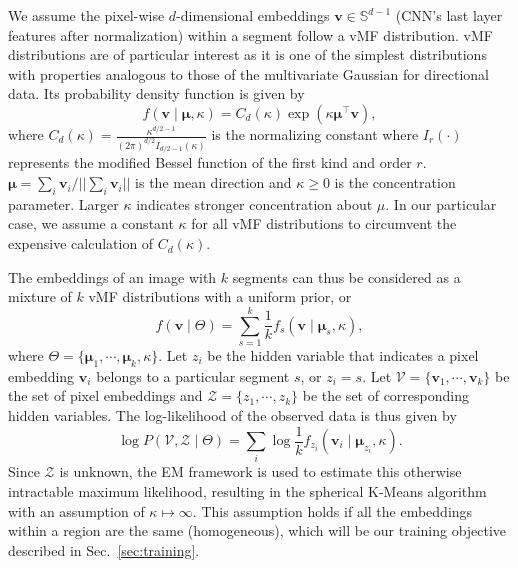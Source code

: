 \documentclass[10pt,twocolumn,letterpaper]{article}
\begin{document}
We assume the pixel-wise $d$-dimensional embeddings $\pmb{v}\in \mathbb{S}^{d-1}$ (CNN's last layer features after normalization) within a segment follow a vMF distribution.
vMF distributions are of particular interest as it is one of the simplest distributions with properties analogous to those of the multivariate Gaussian for directional data.
Its probability density function is given by
\begin{equation}
\label{eqn:vmf}
f(\pmb{v} \mid \pmb{\mu}, \kappa) = C_d(\kappa)
\exp(\kappa \pmb{\mu}^\top \pmb{v}),
\end{equation}
where $C_d(\kappa) = \frac{ \kappa^{d/2-1} }{ (2\pi)^{d/2} I_{d/2-1}(\kappa) }$
is the normalizing constant where $I_r(\cdot)$ represents the modified Bessel function of the first kind and order $r$.
$\pmb{\mu}=\sum_i \pmb{v}_i / ||\sum_i \pmb{v}_i||$ is the mean direction and $\kappa \ge 0$ is the concentration parameter.
Larger $\kappa$ indicates stronger concentration about $\mu$.
In our particular case, we assume a constant $\kappa$ for all vMF distributions to circumvent the expensive calculation of $C_d(\kappa)$.

The embeddings of an image with $k$ segments can thus be considered as a mixture of $k$ vMF distributions with a uniform prior, or
\begin{equation}
\label{eqn:movmf}
f(\pmb{v} \mid \Theta) = \sum_{s=1}^k \frac{1}{k} f_s(\pmb{v} \mid \pmb{\mu}_s, \kappa),
\end{equation}
where $\Theta = \{\pmb{\mu}_1, \cdots, \pmb{\mu}_k, \kappa\}$. Let $z_i$ be the hidden variable that indicates a pixel embedding $\pmb{v}_i$ belongs to a particular segment $s$, or $z_i=s$. Let $\mathcal{V}=\{\pmb{v}_1, \cdots, \pmb{v}_k\}$ be the set of pixel embeddings and $\mathcal{Z}=\{z_1, \cdots, z_k\}$ be the set of corresponding hidden variables. The log-likelihood of the observed data is thus given by
\begin{equation}
\label{eqn:data_likelihood}
\log P(\mathcal{V}, \mathcal{Z}\mid \Theta) = \sum_i \log \frac{1}{k} f_{z_i}(\pmb{v}_i\mid \pmb{\mu}_{z_i},\kappa).
\end{equation}
Since $\mathcal{Z}$ is unknown, the EM framework is used to estimate this otherwise intractable maximum likelihood, resulting in the spherical K-Means algorithm with an assumption of $\kappa \mapsto \infty$.  This assumption holds if all the embeddings within a region are the same (homogeneous), which will be our training objective described in Sec.~\ref{sec:training}.
\end{document}
